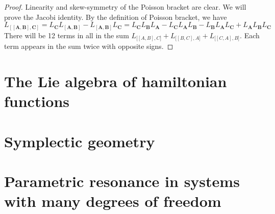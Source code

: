 \documentclass{book}
\numberwithin{equation}{section}
\theoremstyle{plain}
\theoremstyle{definition}
\theoremstyle{remark}
\theoremstyle{remark}
\begin{document}
\begin{proof}
  Linearity and skew-symmetry of the Poisson bracket are clear.
  We will prove the Jacobi identity. By the definition of Poisson bracket,
  we have
  $$
  L_\mathbf{ [[A, B], C]} =
  L_{\mathbf C} L_\mathbf{ [A, B] } -L_\mathbf{ [A, B]} L_{\mathbf C}
  =
   L_{\mathbf C} L_{\mathbf B} L_{\mathbf A}
  -L_{\mathbf C} L_{\mathbf A} L_{\mathbf B}
  -L_{\mathbf B} L_{\mathbf A} L_{\mathbf C}
  +L_{\mathbf A} L_{\mathbf B} L_{\mathbf C}
  $$
  There will be 12 terms in all in the sum
  $ L_{\mathbf [[A, B], C]} + L_{\mathbf [[B, C], A]} + L_{\mathbf [[C, A], B]}$.
  Each term appears in the sum twice with opposite signs.
\end{proof}

\section{The Lie algebra of hamiltonian functions}

\begin{figure}
  \centering
\end{figure}

\section{Symplectic geometry}

\section{Parametric resonance in systems with many degrees of freedom}
\end{document}
